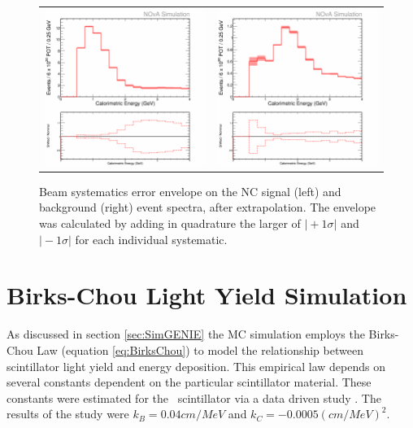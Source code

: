 \begin{figure}[htb]
  \centering
  \begin{tabular}{c c}
    \includegraphics[width=.47\textwidth]{figures/Systs/cNCEXBeamSysts.png} &
    \includegraphics[width=.47\linewidth]{figures/Systs/cBGEXBeamSysts.png} \\
  \end{tabular}
  \caption[Beam Systematic Error Envelopes]{Beam systematics error envelope on the NC signal (left) and background (right) event spectra, after extrapolation. The envelope was calculated by adding in quadrature the larger of $\vert +1\sigma \vert$ and $\vert -1\sigma \vert$ for each individual systematic.}
  \label{fig:SystBeam}
\end{figure}

\section{Birks-Chou Light Yield Simulation}
\label{sec:SystBirks}

As discussed in section \ref{sec:SimGENIE} the MC simulation employs the Birks-Chou Law (equation \ref{eq:BirksChou}) to model the relationship between scintillator light yield and energy deposition. This empirical law depends on several constants dependent on the particular scintillator material. These constants were estimated for the \nova~scintillator via a data driven study \cite{ref:DanBirks}. The results of the study were $k_B = 0.04\unit{cm/MeV}$ and $k_C = -0.0005\unit{(cm/MeV)}^2$.

